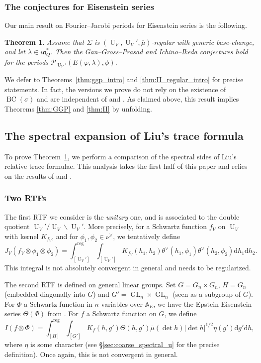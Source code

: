 \documentclass[letterpaper,11pt]{amsart}
\newcommand{\fa}{\mathfrak{a}}
\newcommand{\bA}{\mathbb{A}}
\newcommand{\cP}{\mathcal{P}}
\newcommand{\rd}{\mathrm{d}}
\newcommand{\<}{\negthickspace}
\newcommand{\valP}[1]{\left|#1\right|}
\DeclareMathOperator{\GL}{GL}
\DeclareMathOperator{\U}{U}
\DeclareMathOperator{\BC}{BC}
\theoremstyle{definition}
\theoremstyle{plain}
\newtheorem{theorem}[definition]{Theorem}
\theoremstyle{remark}
\numberwithin{equation}{section}
\begin{document}
\subsubsection{The conjectures for Eisenstein series}

Our main result on Fourier--Jacobi periods for Eisenstein series is the following.

\begin{theorem}
    \label{thm:GGP-IY}
    Assume that $\Sigma$ is $(\U_V,\U_V',\overline{\mu})$-regular with generic base-change, and let $\lambda \in i \fa_Q^*$. Then the Gan--Gross--Prasad and Ichino--Ikeda conjectures hold for the periods $\cP_{\U_V'}(E(\varphi,\lambda),\phi)$.
\end{theorem}

We defer to Theorems~\ref{thm:ggp_intro} and \ref{thm:II_regular_intro} for precise statements. In fact, the versions we prove do not rely on the existence of $\BC(\sigma)$ and are independent of \cite{Mok} and \cite{KMSW}. As claimed above, this result implies Theorems \ref{thm:GGP} and \ref{thm:II} by unfolding.

\subsection{The spectral expansion of Liu's trace formula}

To prove Theorem~\ref{thm:GGP-IY}, we perform a comparison of the spectral sides of Liu's relative trace formulae. This analysis takes the first half of this paper and relies on the results of \cite{BLX1} and \cite{BLX2}.

\subsubsection{Two RTFs}
The first RTF we consider is the \emph{unitary} one, and is associated to the double quotient $\U_V' / \U_V \backslash \U_V'$. More precisely, for a Schwartz function $f_V$ on $\U_V$ with kernel $K_{f_V}$,  and for $\phi_1,  \phi_2 \in \nu^\vee$, we tentatively define
\begin{equation*}
    J_V(f_V \otimes \phi_1 \otimes \phi_2)=\int_{[\U_V']}^{\mathrm{reg}} \int_{[\U_V']} K_{f_V}(h_1,h_2) \theta^\vee(h_1,\phi_1) \theta^\vee(h_2,\phi_2) \rd h_1 \rd h_2.
\end{equation*}
This integral is not absolutely convergent in general and needs to be regularized.

The second RTF is defined on general linear groups. Set $G=G_n \times G_n$, $H=G_n$ (embedded diagonally into $G$) and $G'=\GL_n \times \GL_n$ (seen as a subgroup of $G$). For $\Phi$ a Schwartz function in $n$ variables over $\bA_E$, we have the Epstein Eisenstein series $\Theta(\Phi)$ from \cite{JS}. For $f$ a Schwartz function on $G$, we define
\begin{equation*}
    I(f \otimes \Phi)=\int_{[H]}^{\mathrm{reg}} \int_{[G']} K_f(h,g') \Theta(h,g') \overline{\mu}(\det h) \valP{\det h}^{1/2} \eta(g') \rd g' \rd h,
\end{equation*}
where $\eta$ is some character (see \S\ref{sec:coarse_spectral_u} for the precise definition). Once again, this is not convergent in general.
\end{document}
